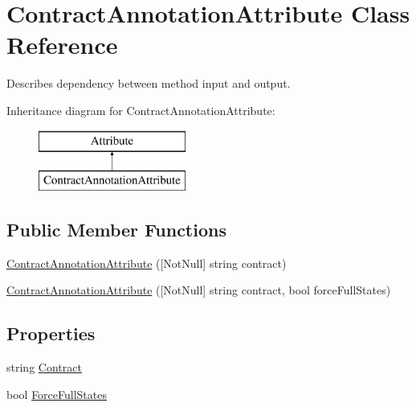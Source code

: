 \hypertarget{class_contract_annotation_attribute}{}\section{Contract\+Annotation\+Attribute Class Reference}
\label{class_contract_annotation_attribute}


Describes dependency between method input and output.  


Inheritance diagram for Contract\+Annotation\+Attribute\+:\begin{figure}[H]
\begin{center}
\leavevmode
\includegraphics[height=2.000000cm]{class_contract_annotation_attribute}
\end{center}
\end{figure}
\subsection*{Public Member Functions}
\begin{DoxyCompactItemize}
\item 
\mbox{\hyperlink{class_contract_annotation_attribute_a635552c48df4e94f26deb7598f7a5028}{Contract\+Annotation\+Attribute}} (\mbox{[}Not\+Null\mbox{]} string contract)
\item 
\mbox{\hyperlink{class_contract_annotation_attribute_a886eedce3d8c7a269549a3293a2bfd99}{Contract\+Annotation\+Attribute}} (\mbox{[}Not\+Null\mbox{]} string contract, bool force\+Full\+States)
\end{DoxyCompactItemize}
\subsection*{Properties}
\begin{DoxyCompactItemize}
\item 
string \mbox{\hyperlink{class_contract_annotation_attribute_a19445968a4365371890d047311eaa1c4}{Contract}}
\item 
bool \mbox{\hyperlink{class_contract_annotation_attribute_a329c6f99fe2ed0c08df3898586cbf965}{Force\+Full\+States}}
\end{DoxyCompactItemize}


